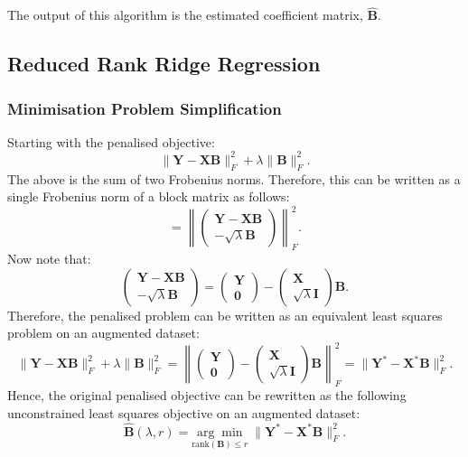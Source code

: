\documentclass[11pt]{report} %
\begin{document}
\noindent The output of this algorithm is the estimated coefficient matrix, $\hat{\mathbf{B}}$.


\subsection{Reduced Rank Ridge Regression}
\subsubsection{Minimisation Problem Simplification}
\label{Mini Simp}
Starting with the penalised objective:
\[
\| \mathbf{Y} - \mathbf{X} \mathbf{B} \|_F^2 + \lambda \| \mathbf{B} \|_F^2.
\]
The above is the sum of two Frobenius norms. Therefore, this can be written as a single Frobenius norm of a block matrix as follows:
\[
= \left\| 
\begin{pmatrix} 
\mathbf{Y} - \mathbf{X} \mathbf{B} \\ 
- \sqrt{\lambda} \mathbf{B} 
\end{pmatrix} 
\right\|_F^2.
\]
Now note that:
\[
\begin{pmatrix} 
\mathbf{Y} - \mathbf{X} \mathbf{B} \\ 
- \sqrt{\lambda} \mathbf{B} 
\end{pmatrix}
=
\begin{pmatrix}
\mathbf{Y} \\
\mathbf{0}
\end{pmatrix}
-
\begin{pmatrix}
\mathbf{X} \\
\sqrt{\lambda} \mathbf{I}
\end{pmatrix}
\mathbf{B}.
\]
Therefore, the penalised problem can be written as an equivalent least squares problem on an augmented dataset:
\[
\| \mathbf{Y} - \mathbf{X} \mathbf{B} \|_F^2 + \lambda \| \mathbf{B} \|_F^2 
= \left\| 
\begin{pmatrix} 
\mathbf{Y} \\ 
\mathbf{0} 
\end{pmatrix} 
- 
\begin{pmatrix} 
\mathbf{X} \\ 
\sqrt{\lambda} \mathbf{I} 
\end{pmatrix} \mathbf{B} 
\right\|_F^2=\| \mathbf{Y}^* - \mathbf{X}^* \mathbf{B} \|_F^2.
\]
Hence, the original penalised objective can be rewritten as the following unconstrained least squares objective on an augmented dataset:
\[
\hat{\mathbf{B}}(\lambda, r) = \underset{\text{rank}(\mathbf{B}) \leq r}{\arg\min} 
\;\| \mathbf{Y}^* - \mathbf{X}^* \mathbf{B} \|_F^2.
\]
\end{document}
